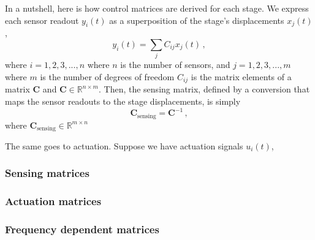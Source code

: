 In a nutshell, here is how control matrices are derived for each stage.
We express each sensor readout $y_i(t)$ as a superposition of the stage's displacements $x_j(t)$,
\begin{equation}
	y_i(t) = \sum_j C_{ij} x_j(t)\,,
\end{equation}
where $i=1,2,3,...,n$ where $n$ is the number of sensors, and $j=1,2,3,...,m$ where $m$ is the number of degrees of freedom $C_{ij}$ is the matrix elements of a matrix $\mathbf{C}$ and $\mathbf{C}\in \mathbb{R}^{n\times m}$.
Then, the sensing matrix, defined by a conversion that maps the sensor readouts to the stage displacements, is simply
\begin{equation}
	\mathbf{C}_{\mathrm{sensing}} = \mathbf{C}^{-1}\,,
\end{equation}
where $\mathbf{C}_\mathrm{sensing} \in \mathbb{R}^{m\times n}$

The same goes to actuation.
Suppose we have actuation signals $u_i(t)$,
\subsubsection{Sensing matrices}
\subsubsection{Actuation matrices}
\subsubsection{Frequency dependent matrices}